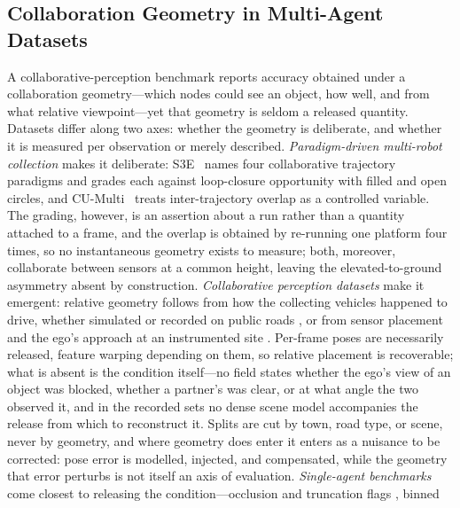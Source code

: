 \subsection{Collaboration Geometry in Multi-Agent Datasets}
\label{sec:related}

A collaborative-perception benchmark reports accuracy obtained under a
collaboration geometry---which nodes could see an object, how well, and from
what relative viewpoint---yet that geometry is seldom a released quantity.
Datasets differ along two axes: whether the geometry is deliberate, and whether
it is measured per observation or merely described. \emph{Paradigm-driven
multi-robot collection} makes it deliberate: S3E~\cite{s3e} names four
collaborative trajectory paradigms and grades each against loop-closure
opportunity with filled and open circles, and CU-Multi~\cite{cumulti} treats
inter-trajectory overlap as a controlled variable. The grading, however, is an
assertion about a run rather than a quantity attached to a frame, and the
overlap is obtained by re-running one platform four times, so no instantaneous
geometry exists to measure; both, moreover, collaborate between sensors at a
common height, leaving the elevated-to-ground asymmetry absent by construction.
\emph{Collaborative perception datasets} make it emergent: relative geometry
follows from how the collecting vehicles happened to drive, whether simulated
\cite{opv2v} or recorded on public roads \cite{v2v4real}, or from sensor
placement and the ego's approach at an instrumented site \cite{dairv2x}.
Per-frame poses are necessarily released, feature warping depending on them, so
relative placement is recoverable; what is absent is the condition itself---no
field states whether the ego's view of an object was blocked, whether a
partner's was clear, or at what angle the two observed it, and in the recorded
sets no dense scene model accompanies the release from which to reconstruct it.
Splits are cut by town, road type, or scene, never by geometry, and where
geometry does enter it enters as a nuisance to be corrected: pose error is
modelled, injected, and compensated, while the geometry that error perturbs is
not itself an axis of evaluation. \emph{Single-agent benchmarks} come closest to
releasing the condition---occlusion and truncation flags \cite{kitti}, binned
